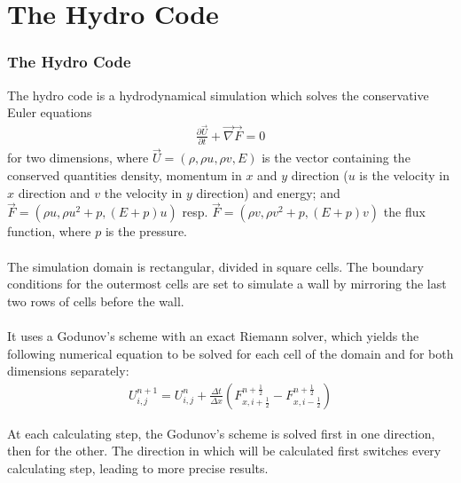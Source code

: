 \documentclass[8pt]{beamer}
\begin{document}
\section{The Hydro Code}
\begin{frame}
	\frametitle{The Hydro Code}
	
	The hydro code is a hydrodynamical simulation which solves the conservative Euler equations
	\begin{align*}
		\frac{\partial \vec{U}}{\partial t} + \vec{\nabla} \vec{F} = 0
	\end{align*}
	for two dimensions, where $\vec{U} = (\rho, \rho u, \rho v, E) $ is the vector containing the conserved quantities density, momentum in $x$ and $y$ direction  ($u$ is the velocity in $x$ direction and $v$ the velocity in $y$ direction) and energy; and $\vec{F} = (\rho u, \rho u^2 + p, (E+p)u)$ resp. $\vec{F} = (\rho v, \rho v^2 + p, (E+p)v)$ the flux function, where $p$ is the pressure.\\~\\
	
	The simulation domain is rectangular, divided in square cells. The boundary conditions for the outermost cells are set to simulate a wall by mirroring the last two rows of cells before the wall. \\~\\
	
	It uses a Godunov's scheme with an exact Riemann solver, which yields the following numerical equation to be solved for each cell of the domain and for both dimensions separately:
	\begin{align*}
		U^{n+1}_{i,j} = U^n_{i,j} + \frac{\Delta t}{\Delta x} \left( F^{n + \frac{1}{2}}_{x, i + \frac{1}{2}} -  F^{n + \frac{1}{2}}_{x, i - \frac{1}{2}}\right)
	\end{align*}
	
	At each calculating step, the Godunov's scheme is solved first in one direction, then for the other. The direction in which will be calculated first switches every calculating step, leading to more precise results.
\end{frame}
\end{document}

